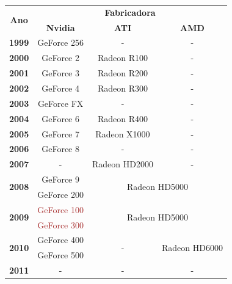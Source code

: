 \documentclass{report}
\begin{document}
\vspace{8mm}
\begin{table}[h]
\centering
\begin{tabular}{|c|c|c|c|}\hline
    \multirow{2}{*}{\textbf{Ano}} & \multicolumn{3}{|c|}{\textbf{Fabricadora}} \\ \cline{2-4}
    & \textbf{Nvidia} & \textbf{ATI} & \textbf{AMD} \\ \hline
    \textbf{1999} & GeForce 256    & -              & -                      \\ \hline
    \textbf{2000} & GeForce 2      & Radeon R100    & -                      \\ \hline
    \textbf{2001} & GeForce 3      & Radeon R200    & -                      \\ \hline
    \textbf{2002} & GeForce 4      & Radeon R300    & -                      \\ \hline
    \textbf{2003} & GeForce FX     & -              & -                      \\ \hline
    \textbf{2004} & GeForce 6      & Radeon R400    & -                      \\ \hline
    \textbf{2005} & GeForce 7      & Radeon X1000   & -                      \\ \hline
    \textbf{2006} & GeForce 8      & -              & -                      \\ \hline
    \textbf{2007} & -              & Radeon HD2000  & -                      \\ \hline
    \multirow{2}{*}{\textbf{2008}} & GeForce 9      & \multicolumn{2}{|c|}{\multirow{2}{*}{Radeon HD5000}}     \\ \cline{2-2}
                                   & GeForce 200    & \multicolumn{2}{|c|}{} \\ \hline
    \multirow{2}{*}{\textbf{2009}} & \textcolor{brown}{GeForce 100}      & \multicolumn{2}{|c|}{\multirow{2}{*}{Radeon HD5000}}     \\ \cline{2-2}
                                   & \textcolor{brown}{GeForce 300}    & \multicolumn{2}{|c|}{} \\ \hline
    \multirow{2}{*}{\textbf{2010}} & GeForce 400    & \multirow{2}{*}{-}  & \multirow{2}{*}{Radeon HD6000}       \\ \cline{2-2}
                                   & GeForce 500    & \multirow{2}{*}{}   & \multirow{2}{*}{} \\ \hline
    \textbf{2011} & -              & -              & -                      \\ \hline

\end{tabular}
\end{table}
\end{document}
